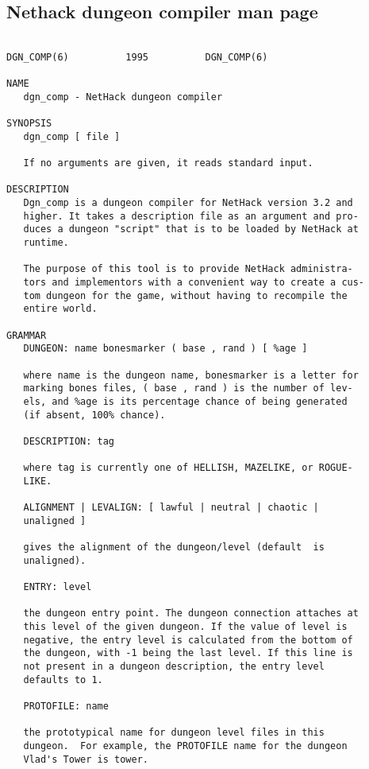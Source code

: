 \documentclass[11pt]{article}
\begin{document}
\subsection{Nethack dungeon compiler man page}
\label{sec:org06dae48}

\begin{verbatim}

DGN_COMP(6)          1995          DGN_COMP(6)

NAME
   dgn_comp - NetHack dungeon compiler

SYNOPSIS
   dgn_comp [ file ]

   If no arguments are given, it reads standard input.

DESCRIPTION
   Dgn_comp is a dungeon compiler for NetHack version 3.2 and
   higher. It takes a description file as an argument and pro-
   duces a dungeon "script" that is to be loaded by NetHack at
   runtime.

   The purpose of this tool is to provide NetHack administra-
   tors and implementors with a convenient way to create a cus-
   tom dungeon for the game, without having to recompile the
   entire world.

GRAMMAR
   DUNGEON: name bonesmarker ( base , rand ) [ %age ]

   where name is the dungeon name, bonesmarker is a letter for
   marking bones files, ( base , rand ) is the number of lev-
   els, and %age is its percentage chance of being generated
   (if absent, 100% chance).

   DESCRIPTION: tag

   where tag is currently one of HELLISH, MAZELIKE, or ROGUE-
   LIKE.

   ALIGNMENT | LEVALIGN: [ lawful | neutral | chaotic |
   unaligned ]

   gives the alignment of the dungeon/level (default  is
   unaligned).

   ENTRY: level

   the dungeon entry point. The dungeon connection attaches at
   this level of the given dungeon. If the value of level is
   negative, the entry level is calculated from the bottom of
   the dungeon, with -1 being the last level. If this line is
   not present in a dungeon description, the entry level
   defaults to 1.

   PROTOFILE: name

   the prototypical name for dungeon level files in this
   dungeon.  For example, the PROTOFILE name for the dungeon
   Vlad's Tower is tower.


\end{verbatim}
\end{document}

